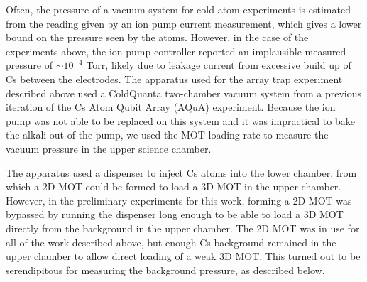 Often, the pressure of a vacuum system for cold atom experiments is estimated from the reading given by an ion pump current measurement, which gives a lower bound on the pressure seen by the atoms. However, in the case of the experiments above, the ion pump controller reported an implausible measured pressure of $\sim 10^{-4}$ Torr, likely due to leakage current from excessive build up of Cs between the electrodes. The apparatus used for the array trap experiment described above used a ColdQuanta two-chamber vacuum system from a previous iteration of the Cs Atom Qubit Array (AQuA) experiment\cite{Graham2018}. Because the ion pump was not able to be replaced on this system and it was impractical to bake the alkali out of the pump, we used the MOT loading rate to measure the vacuum pressure in the upper science chamber.  

The apparatus used a  dispenser to inject Cs atoms into the lower chamber, from which a 2D MOT could be formed to load a 3D MOT in the upper chamber. However, in the preliminary experiments for this work, forming a 2D MOT was bypassed by running the dispenser long enough to be able to load a 3D MOT directly from the background in the upper chamber. The 2D MOT was in use for all of the work described above, but enough Cs background remained in the upper chamber to allow direct loading of a weak 3D MOT. This turned out to be serendipitous for measuring the background pressure, as described below. 

